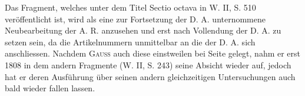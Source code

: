 Das Fragment, welches unter dem Titel Sectio octava in W. II, S. 510 veröffentlicht ist, wird als eine zur Fortsetzung der D. A. unternommene Neubearbeitung der A. R. anzusehen und erst nach Vollendung der D. A. zu setzen sein, da die Artikelnummern unmittelbar an die der D. A. sich anschliessen. Nachdem \textsc{Gauss} auch diese einstweilen bei Seite gelegt, nahm er erst 1808 in dem andern Fragmente (W. II, S. 243) seine Absicht wieder auf, jedoch hat er deren Ausführung über seinen andern gleichzeitigen Untersuchungen auch bald wieder fallen lassen.
